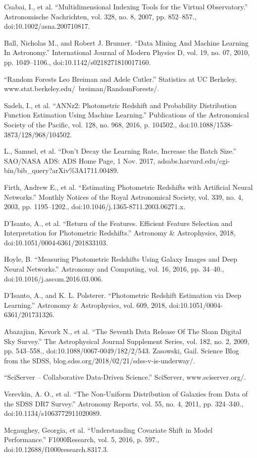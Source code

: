 \documentclass[12pt,letterpaper,oneside,openright]{book}
\begin{document}
\begin{thebibliography}{99\kern\bibindent}
Csabai, I., et al. “Multidimensional Indexing Tools for the Virtual Observatory.” Astronomische Nachrichten, vol. 328, no. 8, 2007, pp. 852–857., doi:10.1002/asna.200710817.


Ball, Nicholas M., and Robert J. Brunner. “Data Mining And Machine Learning In Astronomy.” International Journal of Modern Physics D, vol. 19, no. 07, 2010, pp. 1049–1106., doi:10.1142/s0218271810017160.

“Random Forests Leo Breiman and Adele Cutler.” Statistics at UC Berkeley, www.stat.berkeley.edu/~breiman/RandomForests/.


Sadeh, I., et al. “ANNz2: Photometric Redshift and Probability Distribution Function Estimation Using Machine Learning.” Publications of the Astronomical Society of the Pacific, vol. 128, no. 968, 2016, p. 104502., doi:10.1088/1538-3873/128/968/104502.

L., Samuel, et al. “Don't Decay the Learning Rate, Increase the Batch Size.” SAO/NASA ADS: ADS Home Page, 1 Nov. 2017, adsabs.harvard.edu/cgi-bin/bib\_{}query?arXiv\%{}3A1711.00489.

Firth, Andrew E., et al. “Estimating Photometric Redshifts with Artificial Neural Networks.” Monthly Notices of the Royal Astronomical Society, vol. 339, no. 4, 2003, pp. 1195–1202., doi:10.1046/j.1365-8711.2003.06271.x.

D'Isanto, A., et al. “Return of the Features. Efficient Feature Selection and Interpretation for Photometric Redshifts.” Astronomy \&{} Astrophysics, 2018, doi:10.1051/0004-6361/201833103.

Hoyle, B. “Measuring Photometric Redshifts Using Galaxy Images and Deep Neural Networks.” Astronomy and Computing, vol. 16, 2016, pp. 34–40., doi:10.1016/j.ascom.2016.03.006.

D'Isanto, A., and K. L. Polsterer. “Photometric Redshift Estimation via Deep Learning.” Astronomy \&{} Astrophysics, vol. 609, 2018, doi:10.1051/0004-6361/201731326.

Abazajian, Kevork N., et al. “The Seventh Data Release Of The Sloan Digital Sky Survey.” The Astrophysical Journal Supplement Series, vol. 182, no. 2, 2009, pp. 543–558., doi:10.1088/0067-0049/182/2/543.
Zasowski, Gail. Science Blog from the SDSS, blog.sdss.org/2018/02/21/sdss-v-is-underway/.

“SciServer – Collaborative Data-Driven Science.” SciServer, www.sciserver.org/.

Verevkin, A. O., et al. “The Non-Uniform Distribution of Galaxies from Data of the SDSS DR7 Survey.” Astronomy Reports, vol. 55, no. 4, 2011, pp. 324–340., doi:10.1134/s1063772911020089.

Mcgaughey, Georgia, et al. “Understanding Covariate Shift in Model Performance.” F1000Research, vol. 5, 2016, p. 597., doi:10.12688/f1000research.8317.3.

\end{thebibliography}
\end{document}
